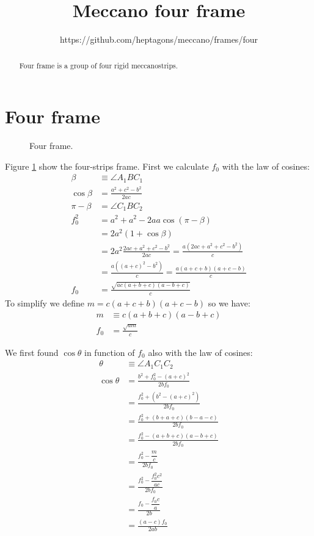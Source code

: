 \documentclass[11pt]{article}
\title{\textbf{Meccano four frame}}
\author{https://github.com/heptagons/meccano/frames/four}
\date{}
\begin{document}
\maketitle
\begin{abstract}
Four frame is a group of four rigid meccano\meccanoref strips.
\end{abstract}

\section{Four frame}

\begin{figure}[H]
 \centering
 \caption{Four frame.}
 \label{fig:four}
\end{figure}

Figure \ref{fig:four} show the four-strips frame. First we calculate $f_0$ with the law of cosines:
\begin{align}
\beta &\equiv \angle{A_1BC_1}\\
\cos\beta &= \frac{a^2 + c^2 - b^2}{2ac}\\
\pi - \beta &= \angle{C_1BC_2}\\
f_0^2 &= a^2 + a^2 - 2aa\cos(\pi-\beta)\\
 &= 2a^2(1 + \cos\beta)\nonumber\\
 &= 2a^2\frac{2ac + a^2 + c^2 - b^2}{2ac} = \frac{a(2ac + a^2 + c^2 - b^2)}c\nonumber\\
 &= \frac{a((a + c)^2 - b^2)}c = \frac{a(a + c + b)(a + c - b)}c \nonumber\\
f_0 &= \frac{\sqrt{ac(a+b+c)(a-b+c)}}c
\end{align}
To simplify we define $m = c(a+c+b)(a+c-b)$ so we have:
\begin{align}
m &\equiv c(a+b+c)(a-b+c)\\
f_0 &= \frac{\sqrt{am}}c
\end{align}

We first found $\cos\theta$ in function of $f_0$ also with the law of cosines:
\begin{align}
\theta &\equiv \angle{A_1C_1C_2}\\
\cos\theta &= \frac{b^2 + f_0^2 - (a+c)^2}{2bf_0}\\
 &= \frac{f_0^2 + (b^2 - (a+c)^2)}{2bf_0}\nonumber\\
 &= \frac{f_0^2 + (b+a+c)(b-a-c)}{2bf_0}\nonumber\\
 &= \frac{f_0^2 - (a+b+c)(a-b+c)}{2bf_0}\nonumber\\
 &= \frac{f_0^2 - \dfrac{m}c}{2bf_0}\nonumber\\
 &= \frac{f_0^2 - \dfrac{f_0^2c^2}{ac}}{2bf_0}\nonumber\\
 &= \frac{f_0 - \dfrac{f_0c}{a}}{2b}\nonumber\\
 &= \frac{(a-c)f_0}{2ab}
\end{align}
\end{document}
